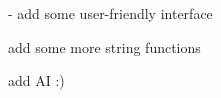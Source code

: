 
\begin{DoxyRefList}
\item[\label{todo__todo000001}%
\hypertarget{todo__todo000001}{}%
page \hyperlink{index}{\-Main \-Page} ]-\/ add some user-\/friendly interface
\begin{DoxyItemize}
\item add some more string functions
\item add \-A\-I \-:) 
\end{DoxyItemize}
\end{DoxyRefList}
